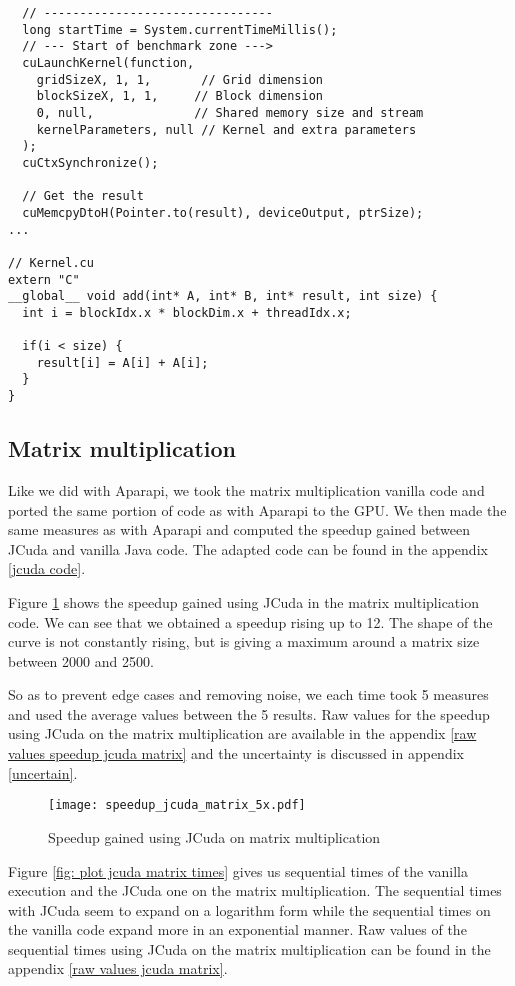 \begin{lstlisting}
  // --------------------------------
  long startTime = System.currentTimeMillis();
  // --- Start of benchmark zone --->
  cuLaunchKernel(function,
    gridSizeX, 1, 1,       // Grid dimension
    blockSizeX, 1, 1,     // Block dimension
    0, null,              // Shared memory size and stream
    kernelParameters, null // Kernel and extra parameters
  );
  cuCtxSynchronize();
  
  // Get the result
  cuMemcpyDtoH(Pointer.to(result), deviceOutput, ptrSize);
...

// Kernel.cu
extern "C"
__global__ void add(int* A, int* B, int* result, int size) {
  int i = blockIdx.x * blockDim.x + threadIdx.x;

  if(i < size) {
    result[i] = A[i] + A[i];
  }
}

\end{lstlisting}

\subsection{Matrix multiplication}

Like we did with Aparapi, we took the matrix multiplication vanilla code and ported the same portion of code as with Aparapi to the GPU. We then made the same measures as with Aparapi and computed the speedup gained between JCuda and vanilla Java code. The adapted code can be found in the appendix \ref{jcuda code}.

Figure \ref{fig plot matrix jcuda} shows the speedup gained using JCuda in the matrix multiplication code. We can see that we obtained a speedup rising up to 12. The shape of the curve is not constantly rising, but is giving a maximum around a matrix size between 2000 and 2500.

So as to prevent edge cases and removing noise, we each time took 5 measures and used the average values between the 5 results. Raw values for the speedup using JCuda on the matrix multiplication are available in the appendix \ref{raw values speedup jcuda matrix} and the uncertainty is discussed in appendix \ref{uncertain}.

\begin{figure}[H]
\centering
\texttt{[image: speedup\_jcuda\_matrix\_5x.pdf]}
\caption{Speedup gained using JCuda on matrix multiplication}
\label{fig plot matrix jcuda}
\end{figure}

Figure \ref{fig: plot jcuda matrix times} gives us sequential times of the vanilla execution and the JCuda one on the matrix multiplication. The sequential times with JCuda seem to expand on a logarithm form while the sequential times on the vanilla code expand more in an exponential manner. Raw values of the sequential times using JCuda on the matrix multiplication can be found in the appendix \ref{raw values jcuda matrix}.

